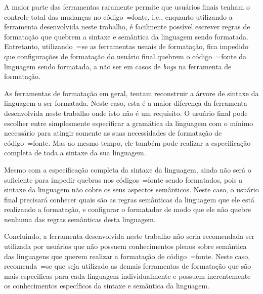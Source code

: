 {    A maior parte das ferramentas raramente permite que usuários finais tenham o controle total das mudanças no código~=fonte,
    i.e.,
    enquanto utilizando a ferramenta desenvolvida neste trabalho,
    é facilmente possível escrever regras de formatação que quebrem a sintaxe e
    semântica da linguagem sendo formatada.
    Entretanto,
    utilizando~=se as ferramentas usuais de formatação,
    fica impedido que configurações de formatação do usuário final quebrem o código~=fonte da linguagem sendo formatada,
    a não ser em casos de \textit{bugs} na ferramenta de formatação.

    As ferramentas de formatação em geral,
    tentam reconstruir a árvore de sintaxe da linguagem a ser formatada.
    Neste caso,
    esta é a maior diferença da ferramenta desenvolvida neste trabalho onde isto não é um requisito.
    O usuário final pode escolher entre simplesmente especificar a gramática da linguagem com o mínimo necessário para atingir somente as suas necessidades de formatação de código~=fonte.
    Mas ao mesmo tempo,
    ele também pode realizar a especificação completa de toda a sintaxe da sua linguagem.

    Mesmo com a especificação completa da sintaxe da linguagem,
    ainda não será o suficiente para impedir quebras nos códigos~=fonte sendo formatados,
    pois a sintaxe da linguagem não cobre os seus aspectos semânticos.
    Neste caso,
    o usuário final precisará conhecer quais são as regras semânticas da linguagem que ele está realizando a formatação,
    e configurar o formatador de modo que ele não quebre nenhuma das regras semânticas desta linguagem.

    Concluindo,
    a ferramenta desenvolvida neste trabalho não seria recomendada ser utilizada por usuários que não possuem conhecimentos plenos sobre semântica das linguagens que querem realizar a formatação de código~=fonte.
    Neste caso,
    recomenda~=se que seja utilizado as demais ferramentas de formatação que são mais especificas para cada linguagem individualmente e
    possuem inerentemente os conhecimentos específicos da sintaxe e
    semântica da linguagem.
}


\section{}

